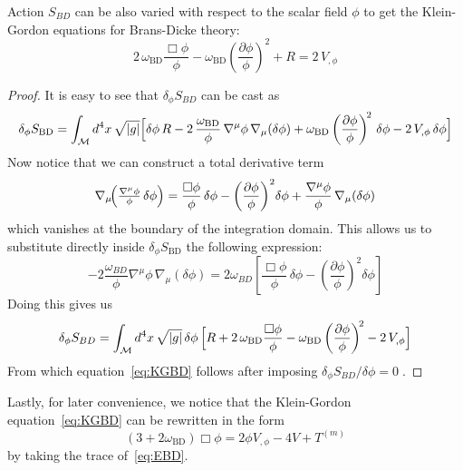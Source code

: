 Action $S_{BD}$ can be also varied with respect to the scalar field $\phi$ to get the Klein-Gordon equations for Brans-Dicke theory:
\begin{equation}\label{eq:KGBD}
    2\,\omega_{\mathrm{BD}}\frac{\Box\phi}{\phi}
    - \omega_{\mathrm{BD}}
      \left(\frac{\partial\phi}{\phi}\right)^{\!2}
    + R = 2\,V_{,\phi}
\end{equation}
\begin{proof}
    It is easy to see that $\delta_\phi S_{BD}$ can be cast as
\begin{equation*}
    \delta_\phi S_{\mathrm{BD}}
      = \int_{\mathcal{M}} d^{4}x\,\sqrt{|g|}
         \Bigl[ \delta\phi\,R
            - 2\,\frac{\omega_{\mathrm{BD}}}{\phi}\,
              \nabla^{\mu}\phi\,\nabla_{\mu}(\delta\phi)
            + \omega_{\mathrm{BD}}
              \left(\frac{\partial\phi}{\phi}\right)^{\!2}\,\delta\phi
            - 2\,V_{,\phi}\,\delta\phi\Bigr]
\end{equation*}
Now notice that we can construct a total derivative term
\begin{equation*}
        \nabla_\mu\!\Bigl(\tfrac{\nabla^{\mu}\phi}{\phi}\,\delta\phi\Bigr)
           = \frac{\Box\phi}{\phi}\,\delta\phi
             - \left(\frac{\partial\phi}{\phi}\right)^{2}\!\delta\phi
             + \frac{\nabla^{\mu}\phi}{\phi}\,\nabla_{\mu}(\delta\phi)
\end{equation*}
which vanishes at the boundary of the integration domain. This allows us to substitute directly inside $\delta_\phi S_{\mathrm{BD}}$ the following expression:
\begin{equation*}
    -2 \frac{\omega_{BD}}{\phi}\nabla^{\mu}\phi\,\nabla_{\mu}(\delta\phi) = 2 \omega_{BD} \left[\frac{\Box\phi}{\phi}\,\delta\phi
    - \left(\frac{\partial\phi}{\phi}\right)^{2}\!\delta\phi\right]
\end{equation*}
Doing this gives us 
\begin{equation*}
    \delta_\phi S_{BD}
      = \int_{\mathcal{M}} d^{4}x\,\sqrt{|g|}\,\delta\phi\,
         \Bigl[
            R
            + 2\,\omega_{\mathrm{BD}}\frac{\Box\phi}{\phi}
            - \omega_{\mathrm{BD}}
              \left(\frac{\partial\phi}{\phi}\right)^{\!2}
            - 2\,V_{,\phi}
         \Bigr]
\end{equation*}
From which equation~\eqref{eq:KGBD} follows after imposing $\delta_\phi S_{BD}/\delta \phi = 0\;$.
\end{proof}
    
Lastly, for later convenience, we notice that the Klein-Gordon equation~\eqref{eq:KGBD} can be rewritten in the form~\cite{Quiros:2019ktw}
\begin{equation}\label{eq:KGBD2}
   \left(3+2\omega_{\mathrm{BD}}\right) \Box \phi = 2 \phi V_{,\phi} -4 V + T^{(m)}
\end{equation}
by taking the trace of~\eqref{eq:EBD}.